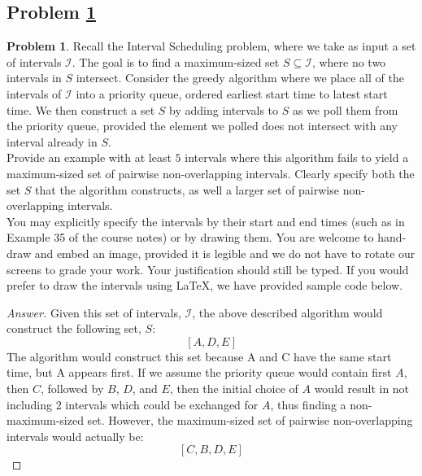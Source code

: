 \documentclass[11pt]{article}
\theoremstyle{definition}
\theoremstyle{definition}
\newtheorem{required}{Problem}
\theoremstyle{definition}
\newcommand{\interval}[4]{\draw (#2, #1) -- (#3, #1); %
\draw (#2, #1-0.11) -- (#2, #1+0.11); %
\draw (#3, #1-0.11) -- (#3, #1+0.11); %
\node[] at (#2-0.6, #1) {#4};
}
\begin{document}
\subsection{Problem \ref{GreedyFail1}}
\begin{required} \label{GreedyFail1}
Recall the \textsf{Interval Scheduling} problem, where we take as input a set of intervals $\mathcal{I}$. The goal is to find a maximum-sized set $S \subseteq \mathcal{I}$, where no two intervals in $S$ intersect. Consider the greedy algorithm where we place all of the intervals of $\mathcal{I}$ into a priority queue, ordered earliest start time to latest start time. We then construct a set $S$ by adding intervals to $S$ as we poll them from the priority queue, provided the element we polled does not intersect with any interval already in $S$. \\

\noindent Provide an example with at least $5$ intervals where this algorithm fails to yield a maximum-sized set of pairwise non-overlapping intervals. Clearly specify both the set $S$ that the algorithm constructs, as well a larger set of pairwise non-overlapping intervals. \\

\noindent You may explicitly specify the intervals by their start and end times (such as in Example 35 of the course notes) or by drawing them. You are welcome to hand-draw and embed an image, provided it is legible and we do not have to rotate our screens to grade your work. Your justification should still be typed. If you would prefer to draw the intervals using \LaTeX, we have provided sample code below.
\end{required}

\begin{proof}[Answer]


Given this set of intervals, $\mathcal{I}$, the above described algorithm would construct the following set, $S$:
\[
	[A, D, E]	
\]
The algorithm would construct this set because A and C have the same start time, but A appears first. If we assume
the priority queue would contain first $A$, then $C$, followed by $B$, $D$, and $E$, then the initial choice of $A$ would result
in not including 2 intervals which could be exchanged for $A$, thus finding a non-maximum-sized set. However, the maximum-sized set of pairwise non-overlapping intervals would actually be:
\[
	[C, B, D, E]
\]

\end{proof}
\end{document}
